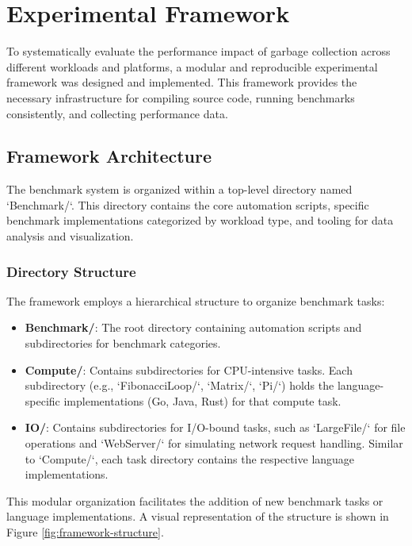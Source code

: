 \documentclass{article}
\begin{document}
\section{Experimental Framework}

To systematically evaluate the performance impact of garbage collection across different workloads and platforms, a modular and reproducible experimental framework was designed and implemented. This framework provides the necessary infrastructure for compiling source code, running benchmarks consistently, and collecting performance data.

\subsection{Framework Architecture}

The benchmark system is organized within a top-level directory named `Benchmark/`. This directory contains the core automation scripts, specific benchmark implementations categorized by workload type, and tooling for data analysis and visualization.

\subsubsection{Directory Structure}
The framework employs a hierarchical structure to organize benchmark tasks:
\begin{itemize}
    \item \textbf{Benchmark/}: The root directory containing automation scripts and subdirectories for benchmark categories.
    \item \textbf{Compute/}: Contains subdirectories for CPU-intensive tasks. Each subdirectory (e.g., `FibonacciLoop/`, `Matrix/`, `Pi/`) holds the language-specific implementations (Go, Java, Rust) for that compute task.
    \item \textbf{IO/}: Contains subdirectories for I/O-bound tasks, such as `LargeFile/` for file operations and `WebServer/` for simulating network request handling. Similar to `Compute/`, each task directory contains the respective language implementations.
\end{itemize}
This modular organization facilitates the addition of new benchmark tasks or language implementations. A visual representation of the structure is shown in Figure \ref{fig:framework-structure}.
\end{document}
